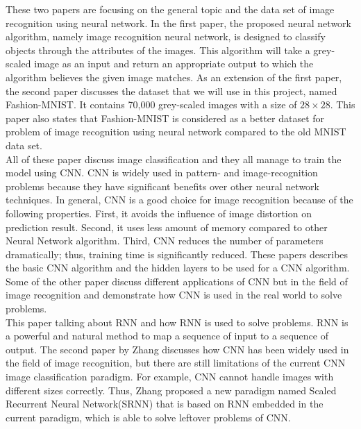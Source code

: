 \documentclass[letterpaper]{article} %
\begin{document}
	\cite{cios1995image,xiao2017fashion} These two papers are focusing on the general topic and the data set of image recognition using neural network. In the first paper, the proposed neural network algorithm, namely image recognition neural network, is designed to classify objects through the attributes of the images. This algorithm will take a grey-scaled image as an input and return an appropriate output to which the algorithm believes the given image matches. As an extension of the first paper, the second paper discusses the dataset that we will use in this project, named Fashion-MNIST. It contains 70,000 grey-scaled images with a size of $28 \times 28$. This paper also states that Fashion-MNIST is considered as a better dataset for problem of image recognition using neural network compared to the old MNIST data set. \\
	\cite{simonyan2015very,hijazi2015using,razavian2014cnn,chen2018the,hou2016fruit,lo1995artificial}
	All of these paper discuss image classification and they all manage to train the model using CNN. CNN is widely used in pattern- and image-recognition problems because they have significant benefits over other neural network techniques. In general, CNN is a good choice for image recognition because of the following properties. First, it avoids the influence of image distortion on prediction result. Second, it uses less amount of memory compared to other Neural Network algorithm. Third, CNN reduces the number of parameters dramatically; thus, training time is significantly reduced. These papers describes the basic CNN algorithm and the hidden layers to be used for a CNN algorithm. Some of the other paper discuss different applications of CNN but in the field of image recognition and demonstrate how CNN is used in the real world to solve problems. \\
	\cite{le2015a,zhang2018image} This paper talking about RNN and how RNN is used to solve problems. RNN is a powerful and natural method to map a sequence of input to a sequence of output. The second paper by Zhang discusses how CNN has been widely used in the field of image recognition, but there are still limitations of the current CNN image classification paradigm. For example, CNN cannot handle images with different sizes correctly. Thus, Zhang proposed a new paradigm named Scaled Recurrent Neural Network(SRNN) that is based on RNN embedded in the current paradigm, which is able to solve leftover problems of CNN.
	
	
\end{document}
